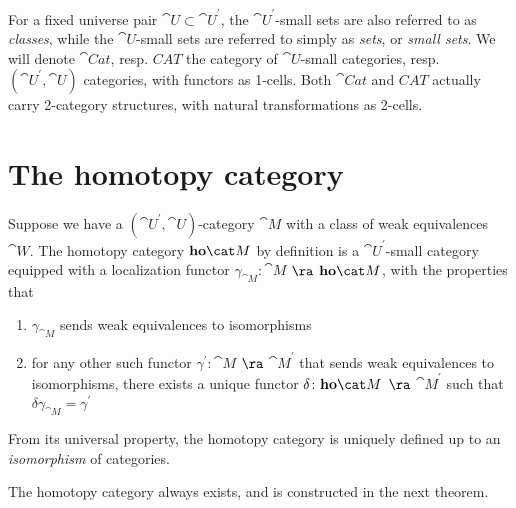 For a fixed universe pair ${\cat U} \subset {\cat U}^{'}$, the ${\cat U}^{'}$-small sets are also referred to as {\it classes}, while the ${\cat U}$-small sets are referred to simply as {\it sets}, or {\it small sets}. We will denote ${\cat Cat}$, resp. $CAT$ the category of ${\cat U}$-small categories, resp. $({\cat U}^{'}, {\cat U})$ categories, with functors as 1-cells. Both ${\cat Cat}$ and $CAT$ actually carry 2-category structures, with natural transformations as 2-cells.

\section{The homotopy category}
\label{sec:whomotopycat}

\begin{defn}
\label{defn:hcat}
Suppose we have a $({\cat U}^{'}, {\cat U})$-category ${\cat M}$ with a class of weak equivalences ${\cat W}$. The homotopy category ${\bf ho}{\cat M}$ by definition is a ${\cat U}^{'}$-small category equipped with a localization functor $\gamma_{\cat M} \colon {\cat M}$ $\ra$ ${\bf ho}{\cat M}$, with the properties that 
\begin{enumerate}
\item
$\gamma_{\cat M}$ sends weak equivalences to isomorphisms
\item
\label{defn:hcat:2}
for any other such functor $\gamma^{'} \colon {\cat M}$ $\ra$ ${\cat M}^{'}$ that sends weak equivalences to isomorphisms, there exists a unique functor $\delta \colon {\bf ho}{\cat M}$ $\ra$ ${\cat M}^{'}$ such that $\delta \gamma_{\cat M} = \gamma^{'}$
\end{enumerate}
\end{defn}

From its universal property, the homotopy category is uniquely defined up to an {\it isomorphism} of categories.

The homotopy category always exists, and is constructed in the next theorem.

